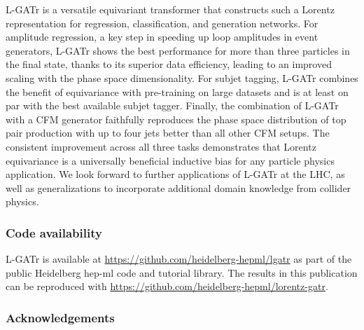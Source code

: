 \documentclass[submission, Phys]{SciPost}
\begin{document}
L-GATr is a versatile  equivariant transformer that constructs such a Lorentz representation for regression, classification, and generation networks.
For amplitude regression, a key step in speeding up loop amplitudes in event generators, L-GATr shows the best performance for more than three particles in the final state, thanks to its superior data efficiency, leading to an improved scaling with the phase space dimensionality.
For subjet tagging, L-GATr combines the benefit of equivariance with pre-training on large datasets and is at least on par with the best available subjet tagger.
Finally, the combination of L-GATr with a CFM generator faithfully reproduces the phase space distribution of top pair production with up to four jets better than all other CFM setups.
%
The consistent improvement across all three tasks demonstrates that Lorentz equivariance is a universally beneficial inductive bias for any particle physics application. We look forward to further applications of L-GATr at the LHC, as well as generalizations to incorporate additional domain knowledge from collider physics.

\subsubsection*{Code availability}

L-GATr is available at \url{https://github.com/heidelberg-hepml/lgatr} as part of the public Heidelberg hep-ml code and tutorial library. The results in this publication can be reproduced with \url{https://github.com/heidelberg-hepml/lorentz-gatr}.

\subsubsection*{Acknowledgements}
\end{document}
